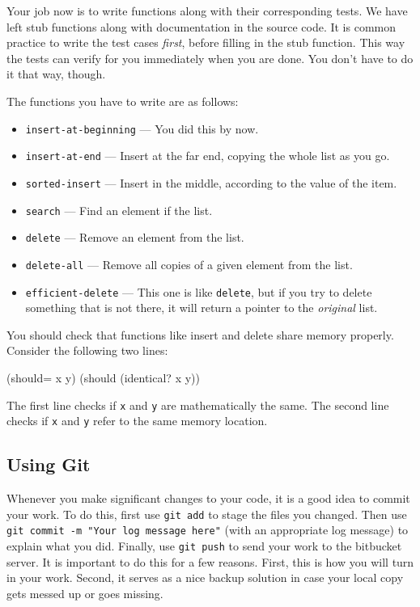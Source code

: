 \documentclass[12pt]{article}
\begin{document}
Your job now is to write functions along with their corresponding tests.  We have left stub
functions along with documentation in the source code.  It is common practice to write the test
cases \emph{first}, before filling in the stub function.  This way the tests can verify for you
immediately when you are done. You don't have to do it that way, though.

The functions you have to write are as follows:

\begin{itemize}
\item \texttt{insert-at-beginning} --- You did this by now.
\item \texttt{insert-at-end} --- Insert at the far end, copying the whole list as you go.
\item \texttt{sorted-insert} --- Insert in the middle, according to the value of the item.
\item \texttt{search} --- Find an element if the list.
\item \texttt{delete} --- Remove an element from the list.
\item \texttt{delete-all} --- Remove all copies of a given element from the list.
\item \texttt{efficient-delete} --- This one is like \texttt{delete}, but if you try to delete
  something that is not there, it will return a pointer to the \emph{original} list.
\end{itemize}

You should check that functions like insert and delete share memory properly.  Consider the
following two lines:

\begin{clojurecode}
  (should= x y)
  (should (identical? x y))
\end{clojurecode}

The first line checks if \texttt{x} and \texttt{y} are mathematically the same.  The second line
checks if \texttt{x} and \texttt{y} refer to the same memory location.

\subsection{Using Git}

Whenever you make significant changes to your code, it is a good idea to commit your work.  To do
this, first use \texttt{git add} to stage the files you changed.  Then use \texttt{git commit -m
  "Your log message here"} (with an appropriate log message) to explain what you did.  Finally, use
\texttt{git push} to send your work to the bitbucket server.  It is important to do this for a few
reasons.  First, this is how you will turn in your work.  Second, it serves as a nice backup
solution in case your local copy gets messed up or goes missing.
\end{document}
